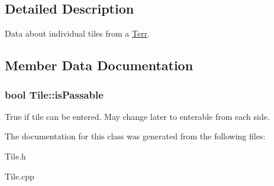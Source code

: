 \subsection{Detailed Description}
Data about individual tiles from a \hyperlink{class_terr}{Terr}. 

\subsection{Member Data Documentation}
\subsubsection[{\texorpdfstring{is\+Passable}{isPassable}}]{\setlength{\rightskip}{0pt plus 5cm}bool Tile\+::is\+Passable\hspace{0.3cm}{\ttfamily [protected]}}\hypertarget{class_tile_afa72b458d549b9533f058e2d2fad0f81}{}\label{class_tile_afa72b458d549b9533f058e2d2fad0f81}
True if tile can be entered. May change later to enterable from each side. 

The documentation for this class was generated from the following files\+:\begin{DoxyCompactItemize}
\item 
Tile.\+h\item 
Tile.\+cpp\end{DoxyCompactItemize}
